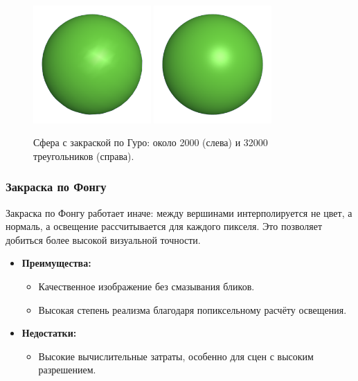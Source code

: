 \begin{figure}[h!]
    \centering
    \includegraphics[width=0.4\textwidth]{img/gouraud1.png}
    \includegraphics[width=0.4\textwidth]{img/gouraud2.png}
    \caption{Сфера с закраской по Гуро: около 2000 (слева) и 32000 треугольников (справа).}
\end{figure}

\subsubsection{Закраска по Фонгу}

\hspace{1.25cm}
Закраска по Фонгу работает иначе: между вершинами интерполируется не цвет, а нормаль, а освещение рассчитывается для каждого пикселя. Это позволяет добиться более высокой визуальной точности.

\begin{itemize}
    \item \textbf{Преимущества:}
    \begin{itemize}
        \item Качественное изображение без смазывания бликов.
        \item Высокая степень реализма благодаря попиксельному расчёту освещения.
    \end{itemize}
    \item \textbf{Недостатки:}
    \begin{itemize}
        \item Высокие вычислительные затраты, особенно для сцен с высоким разрешением.
    \end{itemize}
\end{itemize}

